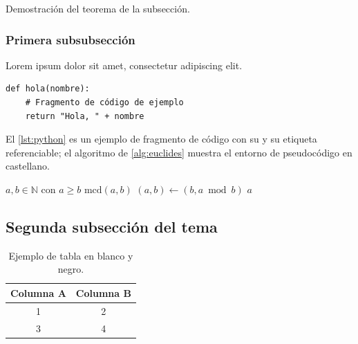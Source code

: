 \begin{demostracion}
    Demostración del teorema de la subsección.
\end{demostracion}

\subsubsection{Primera subsubsección}

Lorem ipsum dolor sit amet, consectetur adipiscing elit.

\begin{lstlisting}[style=python, caption={Ejemplo de fragmento de código en Python.}, label={lst:python}]
def hola(nombre):
    # Fragmento de código de ejemplo
    return "Hola, " + nombre
\end{lstlisting}

El \cref{lst:python} es un ejemplo de fragmento de código con su
\lstlistingname{} y su etiqueta referenciable; el algoritmo de
\cref{alg:euclides} muestra el entorno de pseudocódigo en castellano.

\begin{algorithm}[ht]
    \caption{Algoritmo de Euclides}\label{alg:euclides}
    \begin{algorithmic}[1]
        \Require $a, b \in \mathbb{N}$ con $a \geqslant b$
        \Ensure $\mathrm{mcd}(a, b)$
            \State $(a, b) \gets (b, a \bmod b)$
        \EndWhile
        \State \Return $a$
    \end{algorithmic}
\end{algorithm}

\subsection{Segunda subsección del tema}

\begin{table}[ht]
    \centering
    \begin{tabular}{|c|c|}
        \hline
        \textbf{Columna A} & \textbf{Columna B} \\ \hline
        1 & 2 \\ \hline
        3 & 4 \\ \hline
    \end{tabular}
    \caption{Ejemplo de tabla en blanco y negro.}
    \label{tab:ejemplo}
\end{table}


